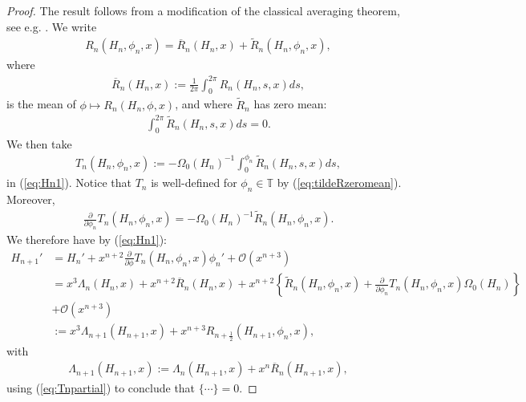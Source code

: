 \documentclass[reqno,12pt]{amsart}
\newcommand{\eqlab}[1]{\label{eq:#1}}
\renewcommand{\eqref}[1]{(\ref{eq:#1})}
\numberwithin{equation}{section}
\begin{document}
\begin{proof}
 The result follows from a modification of the classical averaging theorem, see e.g. \cite{Guckenheimer97}. We write 
 \begin{align*}
  R_n(H_n,\phi_n,x)  = \overline R_n(H_n,x)+\widetilde R_n(H_n,\phi_n,x),
 \end{align*}
where 
\begin{align*}
\overline R_n(H_n,x):= \frac{1}{2\pi}\int_0^{2\pi} R_n(H_n,s,x) ds,
 \end{align*}
 is the mean of $\phi\mapsto R_n(H_n,\phi,x)$, and where $\widetilde R_n$ has zero mean:
  \begin{align}
   \int_{0}^{2\pi} \widetilde R_n(H_n,s,x) ds = 0.\eqlab{tildeRzeromean}
  \end{align}
We then take 
\begin{align*}
T_n(H_n,\phi_n,x):=-\Omega_0(H_n)^{-1} \int_{0}^{\phi_n} \widetilde R_{n}(H_n,s,x)ds,
\end{align*}
in \eqref{Hn1}. Notice that $T_n$ is well-defined for $\phi_n \in \mathbb T$  by \eqref{tildeRzeromean}. Moreover,
\begin{align}
 \frac{\partial }{\partial \phi_n} T_n(H_n,\phi_n,x) = -\Omega_0(H_n)^{-1} \widetilde R_{n}(H_n,\phi_n,x).\eqlab{Tnpartial}
\end{align}
We therefore have by \eqref{Hn1}:
\begin{align*}
H_{n+1}' &= H_n' +x^{n+2} \frac{\partial}{\partial\phi} T_n(H_n,\phi_n,x)\phi_n'+\mathcal O(x^{n+3})\\
 &=x^3 \Lambda_n(H_n,x) +x^{n+2} \overline R_n(H_n,x)+x^{n+2}\left\{ \widetilde R_n(H_n,\phi_n,x) +\frac{\partial}{\partial \phi_n}T_n(H_n,\phi_n,x) \Omega_0(H_n) \right\}\\
 &+ \mathcal O(x^{n+3})\\
 &:=x^3 \Lambda_{n+1}(H_{n+1},x) + x^{n+3} R_{n+ \frac12}(H_{n+1},\phi_n,x),
\end{align*}
with 
\begin{align*}
 \Lambda_{n+1}(H_{n+1},x) :=\Lambda_n(H_{n+1},x)+x^n \overline R_n(H_{n+1},x),
\end{align*}
using \eqref{Tnpartial} to conclude that $\{\cdots\}=0$. 


\end{proof}
\end{document}
